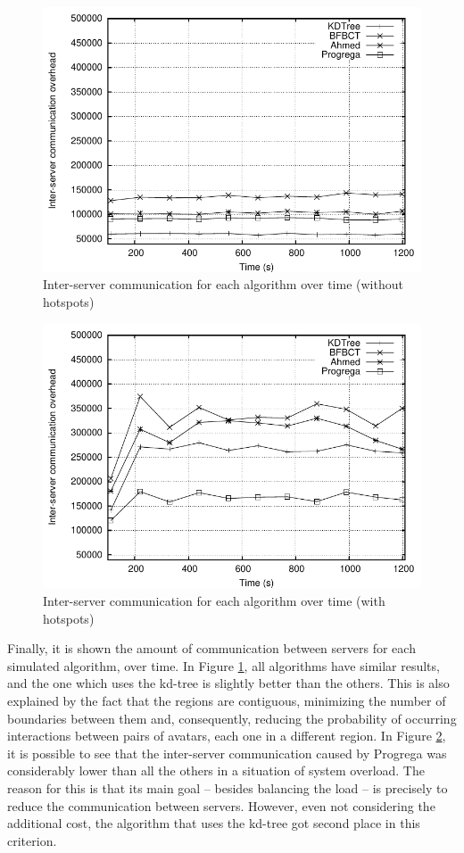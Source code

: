 \documentclass[acmjacm]{acmtrans2m}
\begin{document}
\begin{figure}[!t]
	\centering
	\includegraphics[width=0.8\linewidth]{images/overhead_uniform}
	\caption{Inter-server communication for each algorithm over time (without hotspots)}
	\label{fig:overhead:uniform}
\end{figure}

\begin{figure}[!t]
	\centering
	\includegraphics[width=0.8\linewidth]{images/overhead_hotspots}
	\caption{Inter-server communication for each algorithm over time (with hotspots)}
	\label{fig:overhead:hotspots}
\end{figure}

Finally, it is shown the amount of communication between servers for each simulated algorithm, over time. In Figure \ref{fig:overhead:uniform}, all algorithms have similar results, and the one which uses the kd-tree is slightly better than the others. This is also explained by the fact that the regions are contiguous, minimizing the number of boundaries between them and, consequently, reducing the probability of occurring interactions between pairs of avatars, each one in a different region. In Figure \ref{fig:overhead:hotspots}, it is possible to see that the inter-server communication caused by Progrega was considerably lower than all the others in a situation of system overload. The reason for this is that its main goal -- besides balancing the load -- is precisely to reduce the communication between servers. However, even not considering the additional cost, the algorithm that uses the kd-tree got second place in this criterion.
\end{document}
